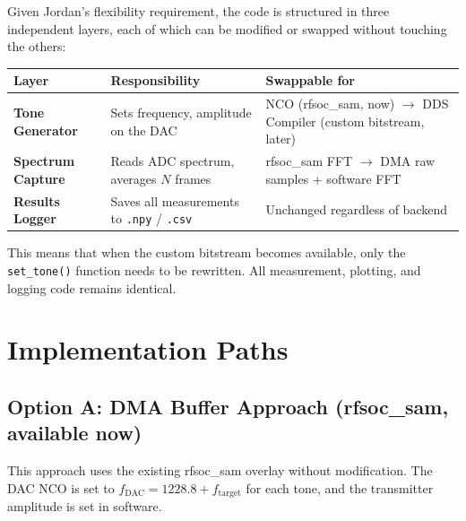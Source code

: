 \documentclass[11pt,a4paper]{article}
\begin{document}
Given Jordan's flexibility requirement, the code is structured in three independent
layers, each of which can be modified or swapped without touching the others:

\begin{center}
\begin{tabular}{L{3cm} L{4cm} L{6.5cm}}
\toprule
\textbf{Layer} & \textbf{Responsibility} & \textbf{Swappable for} \\
\midrule
\textbf{Tone Generator} & Sets frequency, amplitude on the DAC &
  NCO (rfsoc\_sam, now) $\to$ DDS Compiler (custom bitstream, later) \\
\textbf{Spectrum Capture} & Reads ADC spectrum, averages $N$ frames &
  rfsoc\_sam FFT $\to$ DMA raw samples + software FFT \\
\textbf{Results Logger} & Saves all measurements to \texttt{.npy} / \texttt{.csv} &
  Unchanged regardless of backend \\
\bottomrule
\end{tabular}
\end{center}

This means that when the custom bitstream becomes available, only the
\texttt{set\_tone()} function needs to be rewritten. All measurement, plotting,
and logging code remains identical.

\section{Implementation Paths}
\label{sec:impl}

\subsection{Option A: DMA Buffer Approach (rfsoc\_sam, available now)}

This approach uses the existing rfsoc\_sam overlay without modification. The DAC
NCO is set to $f_{\text{DAC}} = 1228.8 + f_{\text{target}}$ for each tone, and
the transmitter amplitude is set in software.
\end{document}
